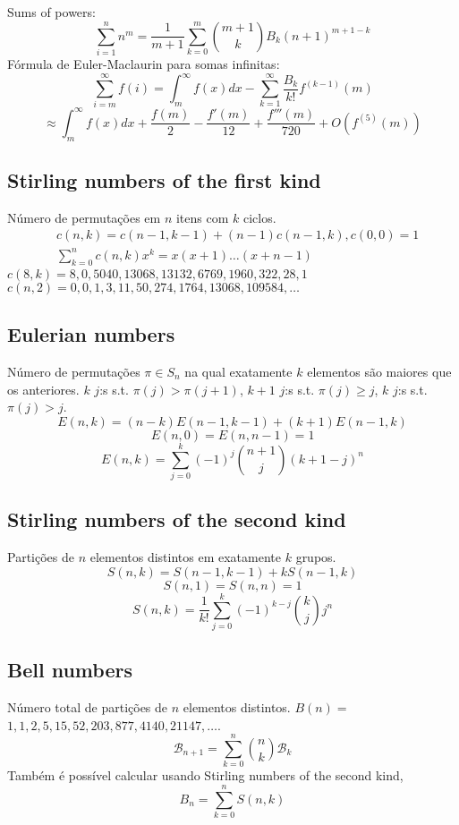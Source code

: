 		Sums of powers:
		\small
		\[ \sum_{i=1}^n n^m = \frac{1}{m+1} \sum_{k=0}^m \binom{m+1}{k} B_k (n+1)^{m+1-k} \]
		\normalsize
		Fórmula de Euler-Maclaurin para somas infinitas:
		\small
		\[ \sum_{i=m}^{\infty} f(i) = \int_m^\infty f(x) dx - \sum_{k=1}^\infty \frac{B_k}{k!}f^{(k-1)}(m) \]
		\[ \approx \int_{m}^\infty f(x)dx + \frac{f(m)}{2} - \frac{f'(m)}{12} + \frac{f'''(m)}{720} + O(f^{(5)}(m)) \]
		\normalsize

	\subsection{Stirling numbers of the first kind}
		Número de permutações em $n$ itens com $k$ ciclos.
		\begin{align*}
			&c(n,k) = c(n-1,k-1) + (n-1) c(n-1,k), c(0,0) = 1\\
			&\textstyle \sum_{k=0}^n c(n,k)x^k = x(x+1) \dots (x+n-1)
		\end{align*}
		$c(8,k) = 8, 0, 5040, 13068, 13132, 6769, 1960, 322, 28, 1$ 
		$c(n,2) = 0, 0, 1, 3, 11, 50, 274, 1764, 13068, 109584, \dots$

	\subsection{Eulerian numbers}
		Número de permutações $\pi \in S_n$ na qual exatamente $k$ elementos são maiores que os anteriores. $k$ $j$:s s.t. $\pi(j)>\pi(j+1)$, $k+1$ $j$:s s.t. $\pi(j)\geq j$, $k$ $j$:s s.t. $\pi(j)>j$.
		$$E(n,k) = (n-k)E(n-1,k-1) + (k+1)E(n-1,k)$$
		$$E(n,0) = E(n,n-1) = 1$$
		$$E(n,k) = \sum_{j=0}^k(-1)^j\binom{n+1}{j}(k+1-j)^n$$

	\subsection{Stirling numbers of the second kind}
		Partições de $n$ elementos distintos em exatamente $k$ grupos.
		$$S(n,k) = S(n-1,k-1) + k S(n-1,k)$$
		$$S(n,1) = S(n,n) = 1$$
		$$S(n,k) = \frac{1}{k!}\sum_{j=0}^k (-1)^{k-j}\binom{k}{j}j^n$$

	\subsection{Bell numbers}
		Número total de partições de $n$ elementos distintos. $B(n) =$
		$1, 1, 2, 5, 15, 52, 203, 877, 4140, 21147, \dots$. 
		\begin{equation*}
        \mathcal{B}_{n+1} = \sum_{k=0}^n \binom{n}{k} \mathcal{B}_k
      \end{equation*}
      Também é possível calcular usando Stirling numbers of the second kind,
      \[B_n = \sum_{k = 0}^{n} S(n, k)\]

